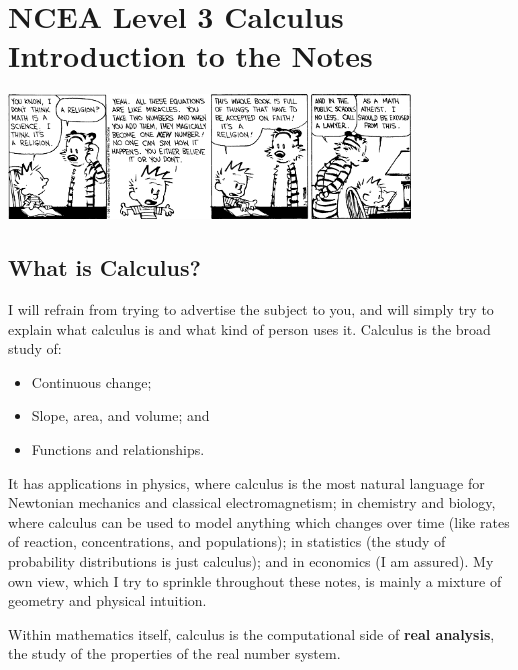 


\section*{NCEA Level 3 Calculus\\Introduction to the Notes}

\begin{center}
  \includegraphics[width=0.8\textwidth]{hobbes}
\end{center}

\subsection* {What is Calculus?}
I will refrain from trying to advertise the subject to you, and will simply try to explain what calculus is and what kind of
person uses it. Calculus is the broad study of:
\begin{itemize}
  \item Continuous change;
  \item Slope, area, and volume; and
  \item Functions and relationships.
\end{itemize}

It has applications in physics, where calculus is the most natural language for Newtonian mechanics and classical electromagnetism; in chemistry
and biology, where calculus can be used to model anything which changes over time (like rates of reaction, concentrations, and populations); in
statistics (the study of probability distributions is just calculus); and in economics (I am assured). My own view, which I try to sprinkle throughout
these notes, is mainly a mixture of geometry and physical intuition.

Within mathematics itself, calculus is the computational side of \textbf{real analysis}, the study of the properties of the real number system.

